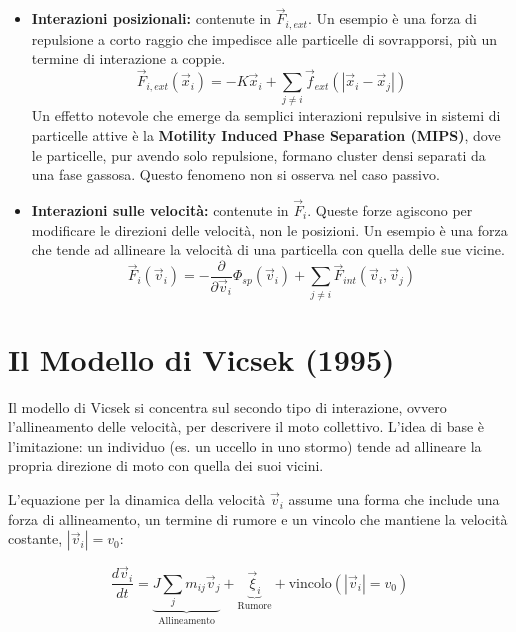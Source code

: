 \begin{itemize}
    \item \textbf{Interazioni posizionali:} contenute in $\vec{F}_{i,ext}$. Un esempio è una forza di repulsione a corto raggio che impedisce alle particelle di sovrapporsi, più un termine di interazione a coppie.
    \begin{equation} \label{eq:ch27_11}
    \vec{F}_{i,ext}(\vec{x}_i) = -K\vec{x}_i + \sum_{j \neq i} \vec{f}_{ext}(|\vec{x}_i - \vec{x}_j|)
    \end{equation}
    Un effetto notevole che emerge da semplici interazioni repulsive in sistemi di particelle attive è la \textbf{Motility Induced Phase Separation (MIPS)}, dove le particelle, pur avendo solo repulsione, formano cluster densi separati da una fase gassosa. Questo fenomeno non si osserva nel caso passivo.
    
    
    
    \item \textbf{Interazioni sulle velocità:} contenute in $\vec{F}_{i}$. Queste forze agiscono per modificare le direzioni delle velocità, non le posizioni. Un esempio è una forza che tende ad allineare la velocità di una particella con quella delle sue vicine.
    \begin{equation} \label{eq:ch27_12}
    \vec{F}_{i}(\vec{v}_i)=-\frac{\partial}{\partial \vec{v}_{i}}\Phi_{sp}(\vec{v}_{i})+\sum_{j\ne i}\vec{F}_{int}(\vec{v}_{i},\vec{v}_{j})
    \end{equation}
\end{itemize}


\section{Il Modello di Vicsek (1995)}
Il modello di Vicsek si concentra sul secondo tipo di interazione, ovvero l'allineamento delle velocità, per descrivere il moto collettivo. L'idea di base è l'imitazione: un individuo (es. un uccello in uno stormo) tende ad allineare la propria direzione di moto con quella dei suoi vicini.



L'equazione per la dinamica della velocità $\vec{v}_i$ assume una forma che include una forza di allineamento, un termine di rumore e un vincolo che mantiene la velocità costante, $|\vec{v}_i| = v_0$:

\begin{equation} \label{eq:ch27_13}
\frac{d\vec{v}_i}{dt} = \underbrace{J\sum_{j}m_{ij}\vec{v}_j}_{\text{Allineamento}} + \underbrace{\vec{\xi}_i}_{\text{Rumore}} + \text{vincolo}(|\vec{v}_i|=v_0)
\end{equation}

